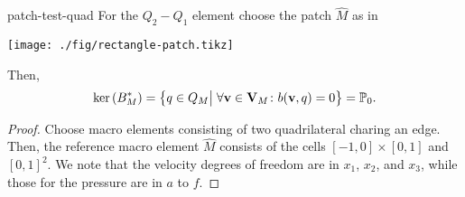 \begin{Lemma}{patch-test-quad}
  For the $Q_2-Q_1$ element choose the patch $\widehat M$ as in
  \begin{center}
    \texttt{[image: ./fig/rectangle-patch.tikz]}
  \end{center}
  Then,
  \begin{gather}
    \operatorname{ker}\left(B_M^*\right) = \bigl\{ q\in Q_M \big\vert
    \;\forall \mathbf v\in \mathbf V_M\colon b(\mathbf v,q) = 0 \bigr\}
    = \mathbb P_0.
  \end{gather}
\end{Lemma}

\begin{proof}
  Choose macro elements consisting of two quadrilateral charing an
  edge. Then, the reference macro element $\widehat M$ consists of the
  cells $[-1,0]\times [0,1]$ and $[0,1]^2$. We note that the velocity
  degrees of freedom are in $x_1$, $x_2$, and $x_3$, while those for
  the pressure are in $a$ to $f$.


\end{proof}
